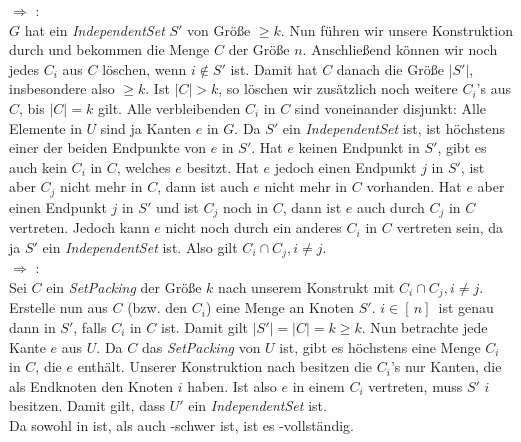 \documentclass[a4paper,11pt]{scrartcl}
\begin{document}
	 $\Rightarrow$ :\\
	$G$ hat ein \textit{IndependentSet} $S'$ von Größe $\geq k$. Nun führen wir unsere Konstruktion durch und bekommen die Menge $C$ der Größe $n$. Anschließend können wir noch jedes $C_i$ aus $C$ löschen, wenn $i \not\in S'$ ist. Damit hat $C$ danach die Größe $\vert S' \vert$, insbesondere also $\geq k$. Ist $\vert C \vert > k$, so löschen wir zusätzlich noch weitere $C_i$'s aus $C$, bis $\vert C \vert = k$ gilt. Alle verbleibenden $C_i$ in $C$ sind voneinander disjunkt: Alle Elemente in $U$ sind ja Kanten $e$ in $G$. Da $S'$ ein \textit{IndependentSet} ist, ist höchstens einer der beiden Endpunkte von $e$ in $S'$. Hat $e$ keinen Endpunkt in $S'$, gibt es auch kein $C_i$ in $C$, welches $e$ besitzt. Hat $e$ jedoch einen Endpunkt $j$ in $S'$, ist aber $C_j$ nicht mehr in $C$, dann ist auch $e$ nicht mehr in $C$ vorhanden. Hat $e$ aber einen Endpunkt $j$ in $S'$ und ist $C_j$ noch in $C$, dann ist $e$ auch durch $C_j$ in $C$ vertreten. Jedoch kann $e$ nicht noch durch ein anderes $C_i$ in $C$ vertreten sein, da ja $S'$ ein \textit{IndependentSet} ist. Also gilt $C_i \cap C_j, i \neq j$.\\
	
	 $\Rightarrow$ :\\
	Sei $C$ ein \textit{SetPacking} der Größe $k$ nach unserem Konstrukt mit $C_i \cap C_j, i \neq j$. Erstelle nun aus $C$ (bzw. den $C_i$) eine Menge an Knoten $S'$. $i \in [\, n ]\,$ ist genau dann in $S'$, falls $C_i$ in $C$ ist. Damit gilt $\vert S' \vert = \vert C \vert = k \geq k$. Nun betrachte jede Kante $e$ aus $U$. Da $C$ das \textit{SetPacking} von $U$ ist, gibt es höchstens eine Menge $C_i$ in $C$, die $e$ enthält. Unserer Konstruktion nach besitzen die $C_i$'s nur Kanten, die als Endknoten den Knoten $i$ haben. Ist also $e$ in einem $C_i$ vertreten, muss $S'$ $i$ besitzen. Damit gilt, dass $U'$ ein \textit{IndependentSet} ist.\\
	
	Da  sowohl in  ist, als auch -schwer ist, ist es -vollständig.
	
\end{document}
